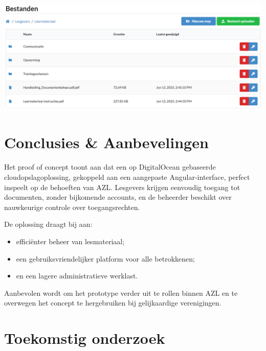\documentclass[a0,portrait]{hogent-poster}
\begin{document}
\begin{multicols}{2}
\begin{center}
  \captionsetup{type=figure}
  \includegraphics[width=1.0\linewidth]{file-manager.png}
\end{center}

\section{Conclusies \& Aanbevelingen}  

Het proof of concept toont aan dat een op DigitalOcean gebaseerde cloudopslagoplossing, gekoppeld aan een aangepaste Angular-interface, perfect inspeelt op de behoeften van AZL. Lesgevers krijgen eenvoudig toegang tot documenten, zonder bijkomende accounts, en de beheerder beschikt over nauwkeurige controle over toegangsrechten.

De oplossing draagt bij aan:
\begin{itemize}
  \item efficiënter beheer van lesmateriaal;
  \item een gebruiksvriendelijker platform voor alle betrokkenen;
  \item en een lagere administratieve werklast.
\end{itemize}

Aanbevolen wordt om het prototype verder uit te rollen binnen AZL en te overwegen het concept te hergebruiken bij gelijkaardige verenigingen.

\section{Toekomstig onderzoek}


\end{multicols}
\end{document}
